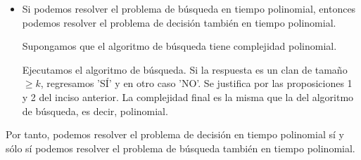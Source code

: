 \begin{itemize}
\begin{itemize}
        En total, podemos resolver el problema en tiempo polinomial: 
        \begin{align*}
        O(|V| \cdot \text{complejidad\_decision} &+ |V| \cdot \text{complejidad\_decisionl}) \\
        &= O(|V| \cdot \text{complejidad\_decision})
        \end{align*}
        
        \item Si podemos resolver el problema de búsqueda en tiempo polinomial, entonces podemos resolver el problema de decisión también en tiempo polinomial.
        
        \vspace{0.5em}
        
        Supongamos que el algoritmo de búsqueda tiene complejidad polinomial.

        Ejecutamos el algoritmo de búsqueda. Si la respuesta es un clan de tamaño $\ge k$, regresamos 'SÍ' y en otro caso 'NO'. Se justifica por las proposiciones 1 y 2 del inciso anterior. La complejidad final es la misma que la del algoritmo de búsqueda, es decir, polinomial.
    \end{itemize}

    Por tanto, podemos resolver el problema de decisión en tiempo polinomial sí y sólo sí podemos resolver el problema de búsqueda también en tiempo polinomial.
\end{itemize}